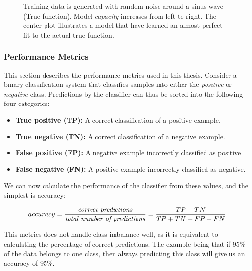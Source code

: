         \begin{figure}[H]
            \centering
            
            \caption[Over/under-fit]{Training data is generated with random noise around a sinus wave (True function). Model \textit{capacity} increases from left to right. The center plot illustrates a model that have learned an almost perfect fit to the actual true function.}
          	\medskip 
            \label{over/under fit fig}
        \end{figure}
        
    \subsubsection{Performance Metrics} \label{f1_score}
        This section describes the performance metrics used in this thesis. Consider a binary classification system that classifies samples into either the \textit{positive} or \textit{negative} class\cite{powers2020evaluation_f1_recall_precision}. Predictions by the classifier can thus be sorted into the following four categories:
        
        \begin{itemize}
            \item \textbf{True positive (TP):} A correct classification of a positive example.
            \item \textbf{True negative (TN):} A correct classification of a negative example.
            \item \textbf{False positive (FP):} A negative example incorrectly classified as positive
            \item \textbf{False negative (FN):} A positive example incorrectly classified as negative.
            \end{itemize}
        
        We can now calculate the performance of the classifier from these values, and the simplest is accuracy\cite{powers2020evaluation_f1_recall_precision}:
        
        \begin{equation}
            accuracy = \dfrac{\textrm{\textit{correct predictions}}}{\textrm{\textit{total number of predictions}}} = \dfrac{TP+TN}{TP+TN+FP+FN} 
        \end{equation}
        
        This metrics does not handle class imbalance well\cite{powers2020evaluation_f1_recall_precision}, as it is equivalent to calculating the percentage of correct predictions. The example being that if 95\% of the data belongs to one class, then always predicting this class will give us an accuracy of 95\%.
        

